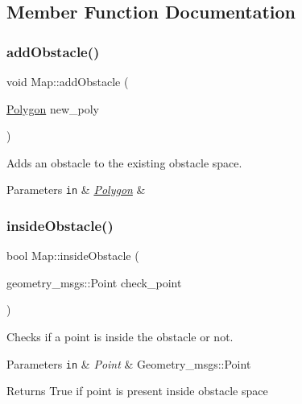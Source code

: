 \subsection{Member Function Documentation}
\mbox{\label{class_map_a2768806fac4c9f0e3a7d0fa5faca825f}} 
\subsubsection{\texorpdfstring{add\+Obstacle()}{addObstacle()}}
{\footnotesize\ttfamily void Map\+::add\+Obstacle (\begin{DoxyParamCaption}\item[{\hyperlink{class_polygon}{Polygon}}]{new\+\_\+poly }\end{DoxyParamCaption})}



Adds an obstacle to the existing obstacle space. 


\begin{DoxyParams}[1]{Parameters}
\mbox{\tt in}  & {\em \hyperlink{class_polygon}{Polygon}} & \\
\hline
\end{DoxyParams}
\mbox{\label{class_map_a6a0352043ce2a93a0a98e7050ef456fd}} 
\subsubsection{\texorpdfstring{inside\+Obstacle()}{insideObstacle()}}
{\footnotesize\ttfamily bool Map\+::inside\+Obstacle (\begin{DoxyParamCaption}\item[{geometry\+\_\+msgs\+::\+Point}]{check\+\_\+point }\end{DoxyParamCaption})}



Checks if a point is inside the obstacle or not. 


\begin{DoxyParams}[1]{Parameters}
\mbox{\tt in}  & {\em Point} & Geometry\+\_\+msgs\+::\+Point\\
\hline
\end{DoxyParams}
\begin{DoxyReturn}{Returns}
True if point is present inside obstacle space 
\end{DoxyReturn}
\mbox{\label{class_map_af7f034da743cac798c603ca9366f0dab}} 
